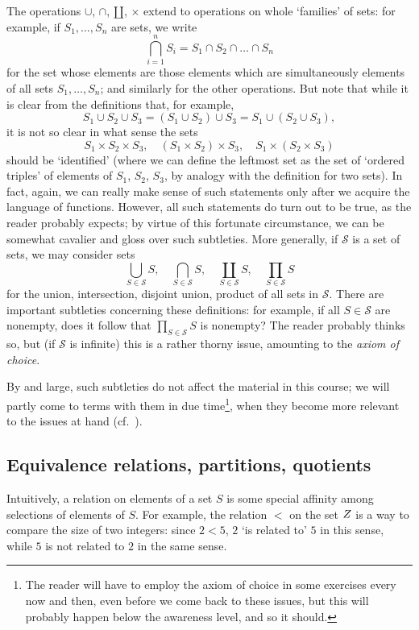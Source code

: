 The operations $\cup$, $\cap$, $\amalg$, $\times$ extend to operations
on whole `families' of sets: for example, if $S_1, \dots, S_n$ are
sets, we write
\[
  \bigcap_{i=1}^{n} S_i = S_1 \cap S_2 \cap \dots \cap S_n
\]
for the set whose elements are those elements which are simultaneously
elements of all sets $S_1, \dots, S_n$; and similarly for the other
operations. But note that while it is clear from the definitions that,
for example,
\[
  S_1 \cup S_2 \cup S_3 = (S_1 \cup S_2) \cup S_3 = S_1 \cup (S_2 \cup
  S_3),
\]
it is not so clear in what sense the sets
\[
  S_1 \times S_2 \times S_3, \quad (S_1 \times S_2) \times S_3, \quad
  S_1 \times (S_2 \times S_3)
\]
should be `identified' (where we can define the leftmost set as the
set of `ordered triples' of elements of $S_1$, $S_2$, $S_3$, by
analogy with the definition for two sets). In fact, again, we can
really make sense of such statements only after we acquire the
language of functions. However, all such statements do turn out to be
true, as the reader probably expects; by virtue of this fortunate
circumstance, we can be somewhat cavalier and gloss over such
subtleties.  More generally, if $\mathcal{S}$ is a set of sets, we may
consider sets
\[
  \bigcup_{S \in \mathcal{S}} S, \quad \bigcap_{S \in \mathcal{S}} S,
  \quad \coprod_{S \in \mathcal{S}} S, \quad \prod_{S \in \mathcal{S}}
  S
\]
for the union, intersection, disjoint union, product of all sets in
$\mathcal{S}$. There are important subtleties concerning these
definitions: for example, if all $S \in \mathcal{S}$ are nonempty,
does it follow that $\prod_{S \in \mathcal{S}} S$ is nonempty? The
reader probably thinks so, but (if $\mathcal{S}$ is infinite) this is
a rather thorny issue, amounting to the \emph{axiom of choice}.

By and large, such subtleties do not affect the material in this
course; we will partly come to terms with them in due
time\footnote{The reader will have to employ the axiom of choice in
  some exercises every now and then, even before we come back to these
  issues, but this will probably happen below the awareness level, and
  so it should.}, when they become more relevant to the issues at hand
(cf.~).

\subsection{Equivalence relations, partitions, quotients}%
\label{subsec:prelims:equiv-relations}

Intuitively, a relation on elements of a set $S$ is some special
affinity among selections of elements of $S$. For example, the
relation $<$ on the set $Z$ is a way to compare the size of two
integers: since $2 < 5$, $2$ `is related to' $5$ in this sense, while
$5$ is not related to $2$ in the same sense.

